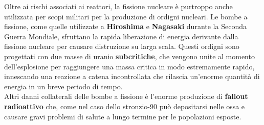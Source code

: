 Oltre ai rischi associati ai reattori, la fissione nucleare è purtroppo anche utilizzata per scopi militari per la produzione di ordigni nucleari. Le bombe a fissione, come quelle utilizzate a \textbf{Hiroshima} e \textbf{Nagasaki} durante la Seconda Guerra Mondiale, sfruttano la rapida liberazione di energia derivante dalla fissione nucleare per causare distruzione su larga scala. Questi ordigni sono progettati con due masse di uranio \textbf{subcritiche}, che vengono unite al momento dell'esplosione per raggiungere una massa critica in modo estremamente rapido, innescando una reazione a catena incontrollata che rilascia un'enorme quantità di energia in un breve periodo di tempo.\\
Altri danni collaterali delle bombe a fissione è l'enorme produzione di \textbf{fallout radioattivo} che, come nel caso dello stronzio-90 può depositarsi nelle ossa e causare gravi problemi di salute a lungo termine per le popolazioni esposte.\\
